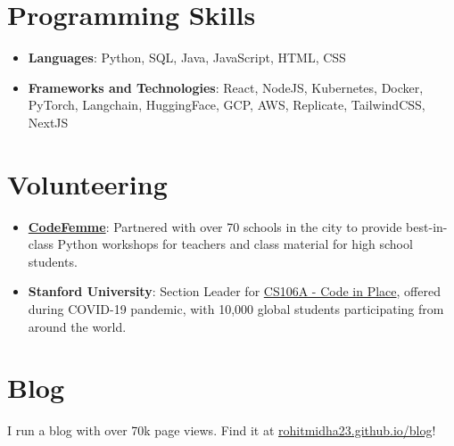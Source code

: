 \documentclass[letterpaper,11pt]{article}
\newcommand{\resumeItem}[2]{
  \item\small{
    \textbf{#1}{: #2 \vspace{-2pt}}
  }
}
\newcommand{\resumeSubHeadingListStart}{\begin{itemize}[leftmargin=*]}
\newcommand{\resumeSubHeadingListEnd}{\end{itemize}}
\begin{document}
\section{Programming Skills}
  \resumeSubHeadingListStart
   \item{
     \textbf{Languages}{: Python, SQL, Java, JavaScript, HTML, CSS}
      }
      \item{
       \textbf{Frameworks and Technologies}{: React, NodeJS, Kubernetes, Docker, PyTorch, Langchain, HuggingFace, GCP, AWS, Replicate, TailwindCSS, NextJS}
    }
  \resumeSubHeadingListEnd

\section{Volunteering}
\resumeSubHeadingListStart
\resumeItem{\href{https://codefemme.github.io/}{CodeFemme}}{Partnered with over 70 schools in the city to provide best-in-class Python workshops for teachers and class material for high school students.}
\resumeItem{Stanford University}{Section Leader for \href{https://codeinplace.stanford.edu/}{CS106A - Code in Place}, offered during COVID-19 pandemic, with 10,000 global students participating from around the world.}
\iffalse
\resumeItem{Google}{Organized the Google AI Explore ML Workshop at SSN College of Engineering.}
\fi
\resumeSubHeadingListEnd
\section{Blog}
I run a blog with over 70k page views. Find it at \href{https://rohitmidha23.github.io/blog}{rohitmidha23.github.io/blog}!
\end{document}
